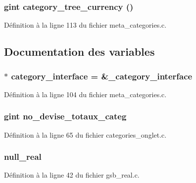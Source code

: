 \subsubsection[{category\_\-tree\_\-currency}]{\setlength{\rightskip}{0pt plus 5cm}gint category\_\-tree\_\-currency ()}\label{meta__categories_8c_a5afe991662ce3aa2469efb6284d91a5e}


Définition à la ligne 113 du fichier meta\_\-categories.c.



\subsection{Documentation des variables}
\subsubsection[{category\_\-interface}]{$\ast$ {\bf category\_\-interface} = \&\_\-category\_\-interface}\label{meta__categories_8c_ac3d52fdc414a19ac674a323f25194bc7}


Définition à la ligne 104 du fichier meta\_\-categories.c.

\subsubsection[{no\_\-devise\_\-totaux\_\-categ}]{\setlength{\rightskip}{0pt plus 5cm}gint {\bf no\_\-devise\_\-totaux\_\-categ}}\label{meta__categories_8c_a8f609654dcfbbcaa6791bcee83d6473d}


Définition à la ligne 65 du fichier categories\_\-onglet.c.

\subsubsection[{null\_\-real}]{ {\bf null\_\-real}}\label{meta__categories_8c_a26f304bec3fdc0651b9aa8765d4de3c6}


Définition à la ligne 42 du fichier gsb\_\-real.c.

